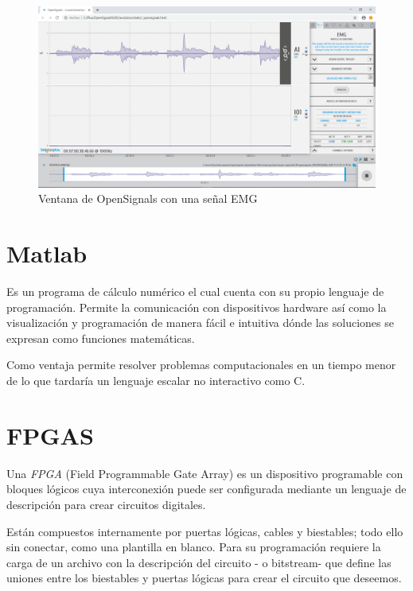 \begin{figure}[H]
	\center
	\includegraphics[scale=0.3]{imagenes/Herramientas/OpenSignals.png}
	\caption{Ventana de OpenSignals con una señal EMG}
	\label{fig:OpenSignals}
\end{figure}

 
\section{Matlab}
Es un programa de cálculo numérico el cual cuenta con su propio lenguaje de programación. Permite la comunicación con dispositivos hardware así como la visualización y programación de manera fácil e intuitiva dónde las soluciones se expresan como funciones matemáticas.\newline 

 Como ventaja permite resolver problemas computacionales en un tiempo menor de lo que tardaría un lenguaje escalar no interactivo como C. \newline
\section{FPGAS}
Una \textit{FPGA} (Field Programmable Gate Array) es un dispositivo programable con bloques lógicos cuya interconexión puede ser configurada mediante un lenguaje de descripción para crear circuitos digitales.\newline

Están compuestos internamente por puertas lógicas, cables y biestables; todo ello sin conectar, como una plantilla en blanco. Para su programación requiere la carga de un archivo con la descripción del circuito - o bitstream- que define las uniones entre los biestables y puertas lógicas para crear el circuito que deseemos. 

